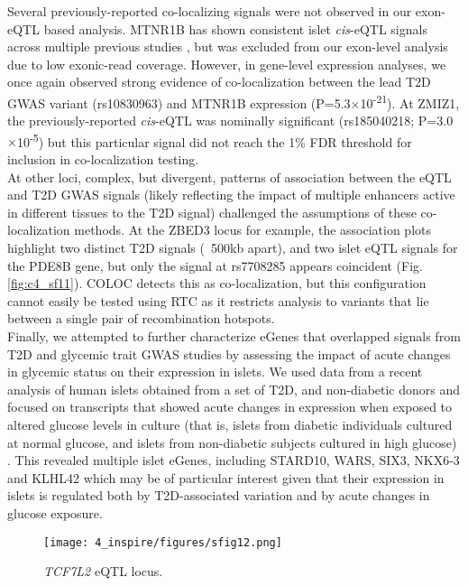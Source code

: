 Several previously-reported co-localizing signals were not observed in our exon-eQTL based analysis. MTNR1B has shown consistent islet \textit{cis}-eQTL signals across multiple previous studies \cite{buntTranscriptExpressionData2015, tuomiIncreasedMelatoninSignaling2016}, but was excluded from our exon-level analysis due to low exonic-read coverage. However, in gene-level expression analyses, we once again observed strong evidence of co-localization between the lead T2D GWAS variant (rs10830963) and MTNR1B expression (P=5.3$\times$10\textsuperscript{-21}). At ZMIZ1, the previously-reported \textit{cis}-eQTL was nominally significant (rs185040218; P=3.0$\times$10\textsuperscript{-5}) but this particular signal did not reach the 1\% FDR threshold for inclusion in co-localization testing. \\

At other loci, complex, but divergent, patterns of association between the eQTL and T2D GWAS signals (likely reflecting the impact of multiple enhancers active in different tissues to the T2D signal) challenged the assumptions of these co-localization methods. At the ZBED3 locus for example, the association plots highlight two distinct T2D signals (~500kb apart), and two islet eQTL signals for the PDE8B gene, but only the signal at rs7708285 appears coincident (Fig. \ref{fig:c4_sf11}). COLOC detects this as co-localization, but this configuration cannot easily be tested using RTC as it restricts analysis to variants that lie between a single pair of recombination hotspots. \\

Finally, we attempted to further characterize eGenes that overlapped signals from T2D and glycemic trait GWAS studies by assessing the impact of acute changes in glycemic status on their expression in islets. We used data from a recent analysis of human islets obtained from a set of T2D, and non-diabetic donors and focused on transcripts that showed acute changes in expression when exposed to altered glucose levels in culture (that is, islets from diabetic individuals cultured at normal glucose, and islets from non-diabetic subjects cultured in high glucose) \cite{ottosson-laaksoGlucoseinducedChangesGene2017}. This revealed multiple islet eGenes, including STARD10, WARS, SIX3, NKX6-3 and KLHL42 which may be of particular interest given that their expression in islets is regulated both by T2D-associated variation and by acute changes in glucose exposure.


\begin{figure}
    \centering
    \texttt{[image: 4\_inspire/figures/sfig12.png]}
    \caption[\textit{TCF7L2} eQTL locus]{\textit{TCF7L2} eQTL locus.}
    \label{fig:c4_sf12}
\end{figure}

